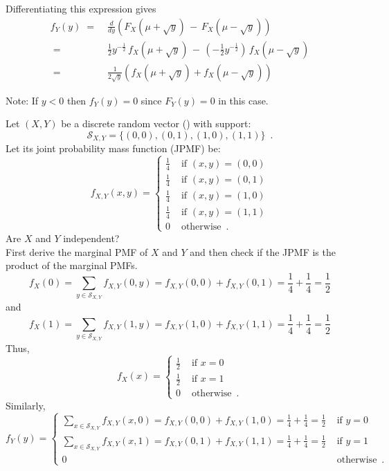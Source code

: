 \begin{ExerciseList}
Differentiating this expression gives
\begin{align*}
f_Y(y) \;=&\; \frac{d}{dy} \left(F_X( \mu + \sqrt y) \,-\, F_X( \mu - \sqrt y)  \right) \\[3pt]
\;=&\;\frac{1}{2} y^{-\frac{1}{2}} \, f_X (\mu + \sqrt y ) \,- \, \left( -\frac{1}{2} y^{-\frac{1}{2}} \right)\, f_X (\mu - \sqrt y ) \\[3pt]
\;=&\;\frac{1}{2 \sqrt y } \left(  f_X (\mu + \sqrt y )  + f_X (\mu - \sqrt y )  \right)
\end{align*}

Note: If $y<0$ then $f_Y(y) = 0$  since  $F_Y(y)=0$ in this case.

\Exercise
Let $(X,Y)$ be a discrete random vector (\rv) with support:
\[
\mathcal{S}_{X,Y} = \{(0,0),(0,1),(1,0),(1,1)\} \enspace .
\]
Let its joint probability mass function (JPMF) be:
\[
f_{X,Y}(x,y) = 
\begin{cases}
\frac{1}{4} & \text{ if } (x,y)=(0,0)\\
\frac{1}{4} & \text{ if } (x,y)=(0,1)\\
\frac{1}{4} & \text{ if } (x,y)=(1,0)\\
\frac{1}{4} & \text{ if } (x,y)=(1,1)\\
0 & \text{ otherwise} \enspace .
\end{cases}
\]
Are $X$ and $Y$ independent? 
\Answer
~\\
First derive the marginal PMF of $X$ and $Y$ and then check if the JPMF is the product of the marginal PMFs.
\[
f_X(0) = \sum_{y \in \mathcal{S}_{X,Y}} f_{X,Y}(0,y) = f_{X,Y}(0,0) + f_{X,Y}(0,1) = \frac{1}{4}+\frac{1}{4}=\frac{1}{2}
\]
and
\[
f_X(1) = \sum_{y \in \mathcal{S}_{X,Y}} f_{X,Y}(1,y) = f_{X,Y}(1,0) + f_{X,Y}(1,1) = \frac{1}{4}+\frac{1}{4}=\frac{1}{2}
\]
Thus,
\[
f_{X}(x) = 
\begin{cases}
\frac{1}{2} & \text{ if } x = 0\\
\frac{1}{2} & \text{ if } x = 1\\
0 & \text{ otherwise} \enspace .
\end{cases}
\]
Similarly,
\[
f_{Y}(y) = 
\begin{cases}
\sum_{x \in \mathcal{S}_{X,Y}} f_{X,Y}(x,0)=f_{X,Y}(0,0) + f_{X,Y}(1,0) = \frac{1}{4}+\frac{1}{4}=\frac{1}{2} & \text{ if } y = 0\\
\sum_{x \in \mathcal{S}_{X,Y}} f_{X,Y}(x,1)=f_{X,Y}(0,1) + f_{X,Y}(1,1) = \frac{1}{4}+\frac{1}{4}=\frac{1}{2} & \text{ if } y = 1\\
0 & \text{ otherwise} \enspace .
\end{cases}
\]
\end{ExerciseList}
